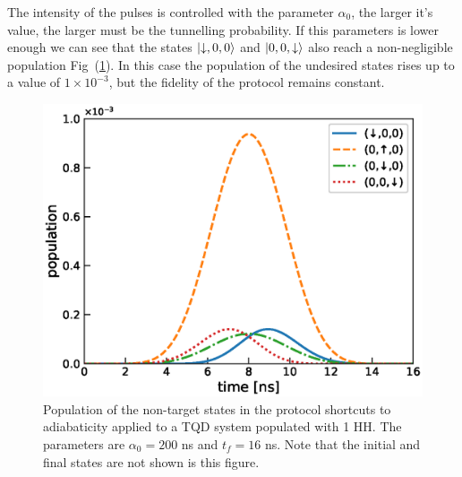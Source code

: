 \documentclass[a4paper,11pt]{article}
\begin{document}
The intensity of the pulses is controlled with the parameter $\alpha_0$, the larger it's value, the larger must be the tunnelling probability. If this parameters is lower enough we can see that the states $\ket{\downarrow,0,0}$ and $\ket{0,0,\downarrow}$ also reach a non-negligible  population Fig~(\ref{fig:STA_TQD_Results_Amplified}). In this case the population of the undesired states rises up to a value of $1\times 10^{-3}$, but the fidelity of the protocol remains constant.
\begin{figure}[!htbp]
	\centering
	\includegraphics[width=0.7\linewidth]{STA_TQD_Results_Amplified.eps}
	\caption{Population of the non-target states in the protocol shortcuts to adiabaticity applied to a TQD system populated with 1 HH. The parameters are $\alpha_0=200$ ns and $t_f=16$ ns. Note that the initial and final states are not shown is this figure.}
	\label{fig:STA_TQD_Results_Amplified}
\end{figure}




\end{document}
